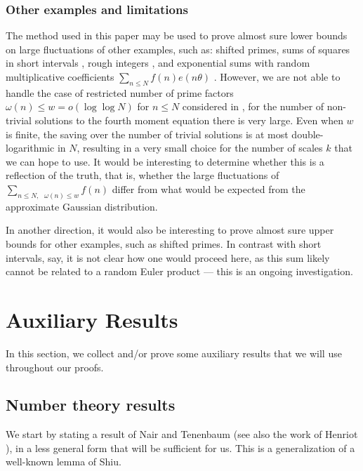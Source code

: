 \documentclass[11pt]{tran-l}
\theoremstyle{definition}
\theoremstyle{remark}
\numberwithin{equation}{section}
\begin{document}
\subsubsection{Other examples and limitations} The method used in this paper may be used to prove almost sure lower bounds on large fluctuations of other examples, such as: shifted primes, sums of squares in short intervals \cite{soundararajan2023clt}, rough integers \cite{Xu2024btran}, and exponential sums with random multiplicative coefficients $\sum_{n\leq N} f(n)e(n\theta)$ \cite{BenatarNishryRodgers2022, Hardy2024imrn, soundararajan2023clt}. However, we are not able to handle the case of restricted number of prime factors $\omega(n)\leq w=o(\log\log N)$ for $n\le N$ considered in \cite{Hough2011, Harper2013}, for the number of non-trivial solutions to the fourth moment equation there is very large. Even when $w$ is finite, the saving over the number of trivial solutions is at most double-logarithmic in $N$, resulting in a very small choice for the number of scales $k$ that we can hope to use. It would be interesting to determine whether this is a reflection of the truth, that is, whether the large fluctuations of $\sum_{n\leq N,\text{ } \omega(n)\leq w} f(n)$ differ from what would be expected from the approximate Gaussian distribution. 

In another direction, it would also be interesting to prove almost sure upper bounds for other examples, such as shifted primes. 
In contrast with short intervals, say, it is not clear how one would proceed here, as this sum likely cannot be related to a random Euler product --- this is an ongoing investigation. 

\section{Auxiliary Results}

In this section, we collect and/or prove some auxiliary results that we will use throughout our proofs.

\subsection{Number theory results} We start by stating a result of Nair and Tenenbaum \cite{NairTenenbaum1998} (see also the work of Henriot \cite{Henriot2012_NairTenenbaumUniform}), in a less general form that will be sufficient for us. This is a generalization of a well-known lemma of Shiu. 
\end{document}
